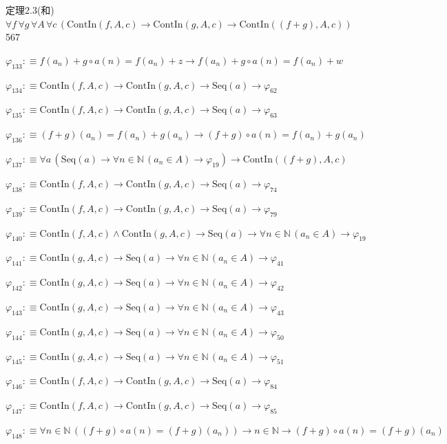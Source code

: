 \begin{fullproof}{定理2.3(和)}{$\forall f\,\forall g\,\forall A\,\forall c\,(\mathrm{ContIn}(f,A,c) \to \mathrm{ContIn}(g,A,c) \to \mathrm{ContIn}((f + g),A,c))$}{567}
\begin{abbrevlist}
\item $\varphi_{133} :\equiv f(a_{n}) + g \circ a(n) = f(a_{n}) + z \to f(a_{n}) + g \circ a(n) = f(a_{n}) + w$
\item $\varphi_{134} :\equiv \mathrm{ContIn}(f,A,c) \to \mathrm{ContIn}(g,A,c) \to \mathrm{Seq}(a) \to \varphi_{62}$
\item $\varphi_{135} :\equiv \mathrm{ContIn}(f,A,c) \to \mathrm{ContIn}(g,A,c) \to \mathrm{Seq}(a) \to \varphi_{63}$
\item $\varphi_{136} :\equiv (f + g)(a_{n}) = f(a_{n}) + g(a_{n}) \to (f + g) \circ a(n) = f(a_{n}) + g(a_{n})$
\item $\varphi_{137} :\equiv \forall a\,(\mathrm{Seq}(a) \to \forall n \in \mathbb{N}\,(a_{n} \in A) \to \varphi_{19}) \to \mathrm{ContIn}((f + g),A,c)$
\item $\varphi_{138} :\equiv \mathrm{ContIn}(f,A,c) \to \mathrm{ContIn}(g,A,c) \to \mathrm{Seq}(a) \to \varphi_{74}$
\item $\varphi_{139} :\equiv \mathrm{ContIn}(f,A,c) \to \mathrm{ContIn}(g,A,c) \to \mathrm{Seq}(a) \to \varphi_{79}$
\item $\varphi_{140} :\equiv \mathrm{ContIn}(f,A,c) \land \mathrm{ContIn}(g,A,c) \to \mathrm{Seq}(a) \to \forall n \in \mathbb{N}\,(a_{n} \in A) \to \varphi_{19}$
\item $\varphi_{141} :\equiv \mathrm{ContIn}(g,A,c) \to \mathrm{Seq}(a) \to \forall n \in \mathbb{N}\,(a_{n} \in A) \to \varphi_{41}$
\item $\varphi_{142} :\equiv \mathrm{ContIn}(g,A,c) \to \mathrm{Seq}(a) \to \forall n \in \mathbb{N}\,(a_{n} \in A) \to \varphi_{42}$
\item $\varphi_{143} :\equiv \mathrm{ContIn}(g,A,c) \to \mathrm{Seq}(a) \to \forall n \in \mathbb{N}\,(a_{n} \in A) \to \varphi_{43}$
\item $\varphi_{144} :\equiv \mathrm{ContIn}(g,A,c) \to \mathrm{Seq}(a) \to \forall n \in \mathbb{N}\,(a_{n} \in A) \to \varphi_{50}$
\item $\varphi_{145} :\equiv \mathrm{ContIn}(g,A,c) \to \mathrm{Seq}(a) \to \forall n \in \mathbb{N}\,(a_{n} \in A) \to \varphi_{51}$
\item $\varphi_{146} :\equiv \mathrm{ContIn}(f,A,c) \to \mathrm{ContIn}(g,A,c) \to \mathrm{Seq}(a) \to \varphi_{84}$
\item $\varphi_{147} :\equiv \mathrm{ContIn}(f,A,c) \to \mathrm{ContIn}(g,A,c) \to \mathrm{Seq}(a) \to \varphi_{85}$
\item $\varphi_{148} :\equiv \forall n \in \mathbb{N}\,((f + g) \circ a(n) = (f + g)(a_{n})) \to n \in \mathbb{N} \to (f + g) \circ a(n) = (f + g)(a_{n})$

\end{abbrevlist}
\end{fullproof}
